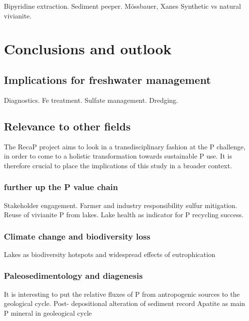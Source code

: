 \documentclass[12pt,twoside]{book}
\begin{document}
Bipyridine extraction.
Sediment peeper.
Mössbauer, Xanes
Synthetic vs natural vivianite.

\section{Conclusions and outlook}\label{conclusions-and-outlook}

\subsection{Implications for freshwater management}\label{implications-for-freshwater-management}

Diagnostics.
Fe treatment.
Sulfate management.
Dredging.

\subsection{Relevance to other fields}\label{relevance-to-other-fields}

The RecaP project aims to look in a transdisciplinary fashion at the P challenge, in order to come to a holistic transformation towards sustainable P use. It is therefore crucial to place the implications of this study in a broader context.

\subsubsection{further up the P value chain}\label{further-up-the-p-value-chain}

Stakeholder engagement. Farmer and industry responsibility sulfur mitigation. Reuse of vivianite P from lakes. Lake health as indicator for P recycling success.

\subsubsection{Climate change and biodiversity loss}\label{climate-change-and-biodiversity-loss}

Lakes as biodiversity hotspots and widespread effects of eutrophication

\subsubsection{Paleosedimentology and diagenesis}\label{paleosedimentology-and-diagenesis}

It is interesting to put the relative fluxes of P from antropogenic sources to the geological cycle.
Post- depositional alteration of sediment record \citep{Dijkstra2018} Apatite as main P mineral in geoleogical cycle\citep{Zhao2024}
\end{document}
